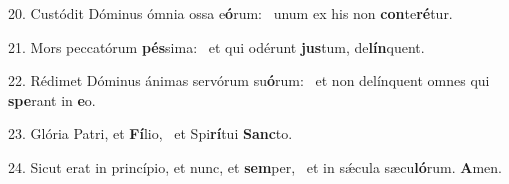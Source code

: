 20. Custódit Dóminus ómnia ossa e\textbf{ó}rum: \ast\  unum ex his non \textbf{con}te\textbf{ré}tur.\

21. Mors peccatórum \textbf{pés}sima: \ast\  et qui odérunt \textbf{jus}tum, de\textbf{lín}quent.\

22. Rédimet Dóminus ánimas servórum su\textbf{ó}rum: \ast\  et non delínquent omnes qui \textbf{spe}rant in \textbf{e}o.\

23. Glória Patri, et \textbf{Fí}lio, \ast\  et Spi\textbf{rí}tui \textbf{Sanc}to.\

24. Sicut erat in princípio, et nunc, et \textbf{sem}per, \ast\  et in sǽcula sæcu\textbf{ló}rum. \textbf{A}men.\


